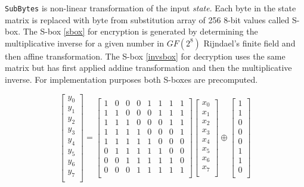\hspace{-1.5em}\texttt{SubBytes} is non-linear transformation of the input 
\textit{state}. Each byte in the state matrix is replaced with byte from 
substitution array of 256 8-bit values called S-box. The S-box \ref{sbox} for 
encryption is generated by determining the multiplicative inverse for a given 
number in $GF(2^8)$ Rijndael's finite field and then affine transformation. 
The S-box \ref{invsbox} for decryption uses the same matrix but has first 
applied addine transformation and then the multiplicative
inverse. For implementation purposes both S-boxes are precomputed. 


\begin{equation}
\label{sboxdef}
  \left[\begin{array}{c}
    y_0\\
    y_1\\
    y_2\\
    y_3\\
    y_4\\
    y_5\\
    y_6\\
    y_7\\
  \end{array}\right]
  =
  \left[\begin{array}{cccccccc}
    1 & 0 & 0 & 0 & 1 & 1 & 1 & 1\\
    1 & 1 & 0 & 0 & 0 & 1 & 1 & 1\\
    1 & 1 & 1 & 0 & 0 & 0 & 1 & 1\\
    1 & 1 & 1 & 1 & 0 & 0 & 0 & 1\\
    1 & 1 & 1 & 1 & 1 & 0 & 0 & 0\\
    0 & 1 & 1 & 1 & 1 & 1 & 0 & 0\\
    0 & 0 & 1 & 1 & 1 & 1 & 1 & 0\\
    0 & 0 & 0 & 1 & 1 & 1 & 1 & 1\\
  \end{array}\right]
  \left[\begin{array}{c}
    x_0\\
    x_1\\
    x_2\\
    x_3\\
    x_4\\
    x_5\\
    x_6\\
    x_7\\
  \end{array}\right]
  \oplus
  \left[\begin{array}{c}
    1\\
    1\\
    0\\
    0\\
    0\\
    1\\
    1\\
    0\\
  \end{array}\right]
\end{equation}

